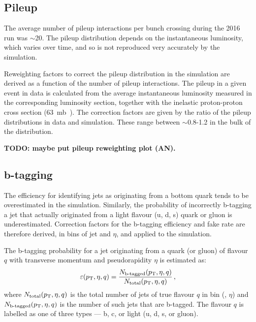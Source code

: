 \subsection{Pileup}

The average number of pileup interactions per bunch crossing during the 2016 
run was $\sim$20. The pileup distribution depends on the instantaneous 
luminosity, which varies over time, and so is not reproduced very accurately by 
the simulation.

Reweighting factors to correct the pileup distribution in the simulation are 
derived as a function of the number of pileup interactions. The pileup in a 
given event in data is calculated from the average instantaneous luminosity 
measured in the corresponding luminosity section, together with the inelastic 
proton-proton cross section (63~mb~\cite{inelasticxs-atlas13tev}). The 
correction factors are given by the ratio of the pileup distributions in data 
and simulation. These range between $\sim$0.8-1.2 in the bulk of the 
distribution.

\textbf{TODO: maybe put pileup reweighting plot (AN).}

\subsection{b-tagging}
\label{sec:analysis-corrections-btagging}

The efficiency for identifying jets as originating from a bottom quark tends to 
be overestimated in the simulation. Similarly, the probability of incorrectly 
b-tagging a jet that actually originated from a light flavour (u, d, s) quark 
or gluon is underestimated. Correction factors for the b-tagging efficiency and 
fake rate are therefore derived, in bins of jet \pt and $\eta$, and applied to 
the simulation.

The b-tagging probability 
for a jet originating from a quark (or gluon) of flavour $q$ with transverse 
momentum \pt and pseudorapidity $\eta$ is estimated as:
\begin{equation}
\label{eqn:btag-eff}
\varepsilon({p_{\text T}}, \eta, q) = \frac{N_{\text{b-tagged}}({p_{\text T}}, \eta, 
q)}{N_{\text{total}}({p_{\text T}}, \eta, q)} \, ,
\end{equation}
where $N_{\text{total}}({p_{\text T}}, \eta, q)$ is the total number of jets of true 
flavour $q$ in bin (\pt, $\eta$) and $N_{\text{b-tagged}}({p_{\text T}}, \eta, q)$ is 
the number of such jets that are b-tagged.
The flavour $q$ is labelled as one of three types --- b, c, or light (u, d, 
s, or gluon).

